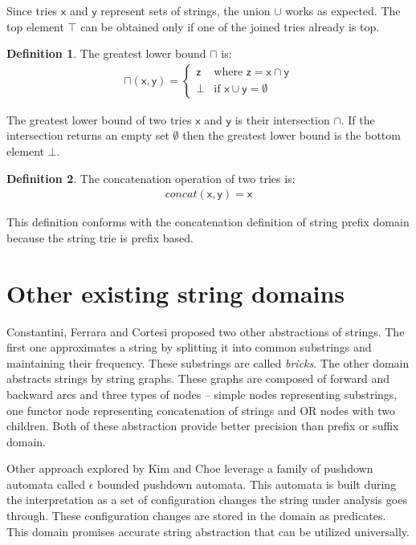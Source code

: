\documentclass[12pt,final,oneside]{fithesis2}
\theoremstyle{definition}
\newtheorem{definition}{Definition}[chapter]
\begin{document}
Since tries $\mathsf{x}$ and $\mathsf{y}$ represent sets of strings, the union
$\cup$ works as expected. The top element $\top$ can be obtained only if one
of the joined tries already is top.

\begin{definition}
The greatest lower bound $\sqcap$ is:
\begin{align*}
\sqcap (\mathsf{x}, \mathsf{y}) =
\begin{cases}
\mathsf{z} & \text{where } \mathsf{z} = \mathsf{x} \cap \mathsf{y} \\
\bot       & \text{if } \mathsf{x} \cup \mathsf{y} = \emptyset
\end{cases}
\end{align*}
\end{definition}

The greatest lower bound of two tries $\mathsf{x}$ and $\mathsf{y}$ is their
intersection $\cap$. If the intersection returns an empty set $\emptyset$ then
the greatest lower bound is the bottom element $\bot$.

\begin{definition}
The concatenation operation of two tries is:
\begin{align*}
\textit{concat}(\mathsf{x}, \mathsf{y}) = \mathsf{x}
\end{align*}
\end{definition}

This definition conforms with the concatenation definition of string prefix
domain because the string trie is prefix based.


\section{Other existing string domains}
\label{sec:otherstringdomains}

Constantini, Ferrara and Cortesi \cite{Constantini11-1} proposed two other
abstractions of strings. The first one approximates a string by splitting
it into common substrings and maintaining their frequency. These substrings
are called \textit{bricks}. The other domain abstracts strings by string graphs.
These graphs are composed of forward and backward arcs and three types of
nodes -- simple nodes representing substrings, one functor node representing
concatenation of strings and OR nodes with two children. Both of these
abstraction provide better precision than prefix or suffix domain.

Other approach explored by Kim and Choe \cite{KimChoe11-1} leverage a family
of pushdown automata called $\epsilon$ bounded pushdown automata. This automata
is built during the interpretation as a set of configuration changes the string
under analysis goes through. These configuration changes are stored in the
domain as predicates. This domain promises accurate string abstraction that
can be utilized universally.
\end{document}
